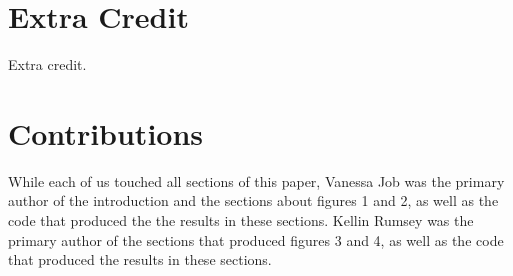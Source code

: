 \documentclass[conference]{IEEEtran}
\begin{document}
\section{Extra Credit}  Extra credit.  






\section{Contributions}

While each of us touched all sections of this paper, Vanessa Job was the primary author of the introduction and the sections about figures 1 and 2, as well as the code that produced the the results in these sections.   Kellin Rumsey was the primary author of the sections that produced figures 3 and 4, as well as the code that produced the results in these sections.  



\end{document}

